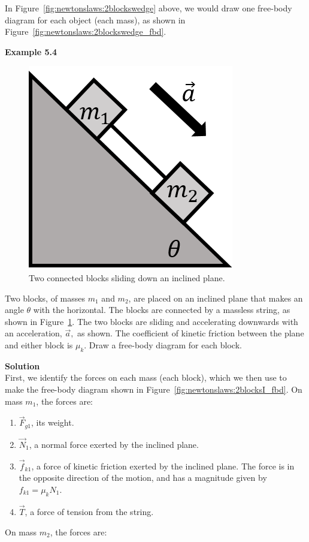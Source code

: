 In Figure~\ref{fig:newtonslaws:2blockswedge} above, we would draw one free-body diagram for each object (each mass), as shown in Figure~\ref{fig:newtonslaws:2blockswedge_fbd}.

\begin{framed}
\textbf{Example 5.4}\\
\begin{figure}[!htbp]
\centering
\includegraphics[width=0.2\linewidth]{files/2blocksI-3c13a2d5a477e53026e27df46a6b9d2a.png}
\caption[]{Two connected blocks sliding down an inclined plane.}
\label{fig:newtonslaws:2blocksI}
\end{figure}

Two blocks, of masses $m_1$ and $m_2$, are placed on an inclined plane that makes an angle $\theta$ with the horizontal. The blocks are connected by a massless string, as shown in Figure~\ref{fig:newtonslaws:2blocksI}. The two blocks are sliding and accelerating downwards with an acceleration, $\vec a,$ as shown. The coefficient of kinetic friction between the plane and either block is $\mu_k$. Draw a free-body diagram for each block.

\begin{framed}
\textbf{Solution}\\
First, we identify the forces on each mass (each block), which we then use to make the free-body diagram shown in Figure~\ref{fig:newtonslaws:2blocksI_fbd}. On mass $m_1$, the forces are:

\begin{enumerate}
\item $\vec F_{g1}$, its weight.
\item $\vec N_1$, a normal force exerted by the inclined plane.
\item $\vec f_{k1}$, a force of kinetic friction exerted by the inclined plane. The force is in the opposite direction of the motion, and has a magnitude given by $f_{k1}=\mu_kN_1$.
\item $\vec T$, a force of tension from the string.
\end{enumerate}

On mass $m_2$, the forces are:


\end{framed}
\end{framed}
